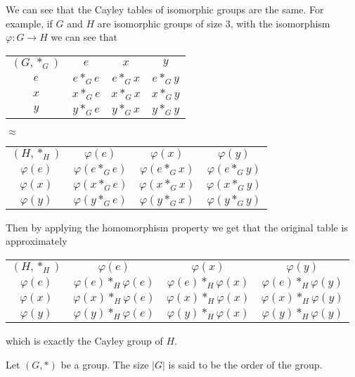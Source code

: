\documentclass[11pt,a4paper]{article}
\begin{document}
  We can see that the Cayley tables of isomorphic groups are the same.
  For example, if $G$ and $H$ are isomorphic groups of size $3$,
  with the isomorphism $\varphi \colon G \to H$ we can see that
  \begin{center}
    \begin{tabular}{c | c c c}
      $(G,*_G)$ & $e$ & $x$ & $y$ \\
      \cline{1-4}
      $e$ & $e *_G e$ & $e *_G x$ & $e *_G y$ \\
      $x$ & $x *_G e$ & $x *_G x$ & $x *_G y$ \\
      $y$ & $y *_G e$ & $y *_G x$ & $y *_G y$ 
    \end{tabular} $\approx$
    \begin{tabular}{c | c c c}
      $(H,*_H)$ & $\varphi(e)$ & $\varphi(x)$ & $\varphi(y)$ \\
      \cline{1-4}
      $\varphi(e)$ & $\varphi(e *_G e)$ & $\varphi(e *_G x)$ & $\varphi(e *_G y)$ \\
      $\varphi(x)$ & $\varphi(x *_G e)$ & $\varphi(x *_G x)$ & $\varphi(x *_G y)$ \\
      $\varphi(y)$ & $\varphi(y *_G e)$ & $\varphi(y *_G x)$ & $\varphi(y *_G y)$
    \end{tabular}
  \end{center}
  Then by applying the homomorphism property we get that the original
  table is approximately
  \begin{center} 
    \begin{tabular}{c | c c c}
      $(H,*_H)$ & $\varphi(e)$ & $\varphi(x)$ & $\varphi(y)$ \\
      \cline{1-4}
      $\varphi(e)$ & $\varphi(e) *_H \varphi(e)$ & $\varphi(e) *_H \varphi(x)$ & 
        $\varphi(e) *_H \varphi(y)$ \\
      $\varphi(x)$ & $\varphi(x) *_H \varphi(e)$ & $\varphi(x) *_H \varphi(x)$ &
        $\varphi(x) *_H \varphi(y)$ \\
      $\varphi(y)$ & $\varphi(y) *_H \varphi(e)$ & $\varphi(y) *_H \varphi(x)$ &
        $\varphi(y) *_H \varphi(y)$
    \end{tabular}
  \end{center}

  which is exactly the Cayley group of $H$.
  
  \begin{definition}
    Let $(G, *)$ be a group. The size $|G|$ is said to be the order
    of the group.
  \end{definition}
\end{document}
